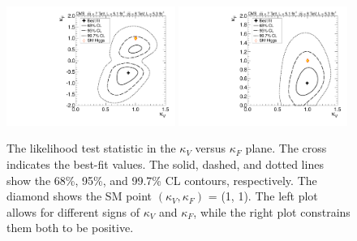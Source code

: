 \documentclass[11pt,twoside,a4paper,cmspaper,final,collab]{cms-tdr}
\begin{document}
\begin{figure}
\centering
\includegraphics[width=0.49\textwidth]{figures/comb/sqr_cvcf_scan_2d_comb_HPA_smallGGScale} \hfill
\includegraphics[width=0.49\textwidth]{figures/comb/sqr_cvcf_cut_scan_2d_comb_HPA_smallGGScale}
\caption{
The likelihood test statistic in the  $\kappa_V$ versus $\kappa_F$ plane.
The cross indicates the best-fit values. The solid, dashed, and dotted lines  show the
68\%, 95\%,  and 99.7\% CL contours, respectively.
The diamond shows the SM point
$(\kappa_V, \kappa_F)$ = (1, 1). The left plot allows for different signs of $\kappa_V$ and $\kappa_F$, while the
right plot constrains them both to be positive.
}
\label{fig:cVcF_2D}
\end{figure}
\end{document}
